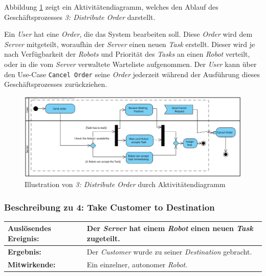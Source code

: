 			Abbildung \ref{fig:2-4-distribute-order-aktivitaetendiagramm} zeigt ein Aktivitätendiagramm, welches den Ablauf des Geschäftsprozesses \emph{3: Distribute Order} darstellt.

			Ein \emph{User} hat eine \emph{Order}, die das System bearbeiten soll. Diese \emph{Order} wird dem \emph{Server} mitgeteilt, woraufhin der \emph{Server} einen neuen \emph{Task} erstellt. Dieser wird je nach Verfügbarkeit der \emph{Robots} und Priorität des \emph{Tasks} an einen \emph{Robot} verteilt, oder in die vom \emph{Server} verwaltete Warteliste aufgenommen. Der \emph{User} kann über den Use-Case \texttt{Cancel Order} seine \emph{Order} jederzeit während der Ausführung dieses Geschäftsprozesses zurückziehen.
			
			\begin{figure}[H]
				\centering
				\includegraphics[width=\textwidth]{img/DistributeOrder}
				\caption{Illustration von \emph{3: Distribute Order} durch Aktivitätendiagramm}
				\label{fig:2-4-distribute-order-aktivitaetendiagramm}
			\end{figure}
			
		
			\subsubsection{Beschreibung zu 4: Take Customer to Destination}

			\begin{table}[H]
				\centering
				\begin{tabularx}{\textwidth}{|p{3cm}|X|}
				\hline
				\textbf{Auslösendes Ereignis:} & Der \emph{Server} hat einem \emph{Robot} einen neuen \emph{Task} zugeteilt.\\ \hline
				\textbf{Ergebnis:} & Der \emph{Customer} wurde zu seiner \emph{Destination} gebracht.\\ \hline
				\textbf{Mitwirkende:} &	Ein einzelner, autonomer \emph{Robot}. \\
				\hline
				\end{tabularx}
				\label{tab:2-4-take-customer-to-destination}
			\end{table}

